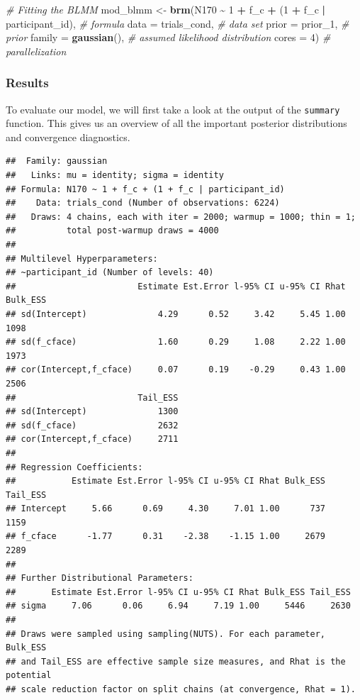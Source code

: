 \documentclass[
  doc,12pt,floatsintext]{apa7}
\newenvironment{Shaded}{\begin{snugshade}}{\end{snugshade}}
\newcommand{\AttributeTok}[1]{\textcolor[rgb]{0.13,0.29,0.53}{#1}}
\newcommand{\CommentTok}[1]{\textcolor[rgb]{0.56,0.35,0.01}{\textit{#1}}}
\newcommand{\DecValTok}[1]{\textcolor[rgb]{0.00,0.00,0.81}{#1}}
\newcommand{\FunctionTok}[1]{\textcolor[rgb]{0.13,0.29,0.53}{\textbf{#1}}}
\newcommand{\NormalTok}[1]{#1}
\newcommand{\OtherTok}[1]{\textcolor[rgb]{0.56,0.35,0.01}{#1}}
\newcommand{\SpecialCharTok}[1]{\textcolor[rgb]{0.81,0.36,0.00}{\textbf{#1}}}
\begin{document}
\begin{Shaded}
\begin{Highlighting}[]
\CommentTok{\# Fitting the BLMM}
\NormalTok{mod\_blmm }\OtherTok{\textless{}{-}} \FunctionTok{brm}\NormalTok{(N170 }\SpecialCharTok{\textasciitilde{}} \DecValTok{1} \SpecialCharTok{+}\NormalTok{ f\_c }\SpecialCharTok{+}\NormalTok{ (}\DecValTok{1} \SpecialCharTok{+}\NormalTok{ f\_c }\SpecialCharTok{|}\NormalTok{ participant\_id), }\CommentTok{\# formula}
                \AttributeTok{data =}\NormalTok{ trials\_cond, }\CommentTok{\# data set}
                \AttributeTok{prior =}\NormalTok{ prior\_1, }\CommentTok{\# prior}
                \AttributeTok{family =} \FunctionTok{gaussian}\NormalTok{(), }\CommentTok{\# assumed likelihood distribution}
                \AttributeTok{cores =} \DecValTok{4}\NormalTok{) }\CommentTok{\# parallelization}
\end{Highlighting}
\end{Shaded}

\subsubsection{Results}\label{results-1}

To evaluate our model, we will first take a look at the output of the \texttt{summary} function. This gives us an overview of all the important posterior distributions and convergence diagnostics.



\footnotesize

\begin{verbatim}
##  Family: gaussian 
##   Links: mu = identity; sigma = identity 
## Formula: N170 ~ 1 + f_c + (1 + f_c | participant_id) 
##    Data: trials_cond (Number of observations: 6224) 
##   Draws: 4 chains, each with iter = 2000; warmup = 1000; thin = 1;
##          total post-warmup draws = 4000
## 
## Multilevel Hyperparameters:
## ~participant_id (Number of levels: 40) 
##                        Estimate Est.Error l-95% CI u-95% CI Rhat Bulk_ESS
## sd(Intercept)              4.29      0.52     3.42     5.45 1.00     1098
## sd(f_cface)                1.60      0.29     1.08     2.22 1.00     1973
## cor(Intercept,f_cface)     0.07      0.19    -0.29     0.43 1.00     2506
##                        Tail_ESS
## sd(Intercept)              1300
## sd(f_cface)                2632
## cor(Intercept,f_cface)     2711
## 
## Regression Coefficients:
##           Estimate Est.Error l-95% CI u-95% CI Rhat Bulk_ESS Tail_ESS
## Intercept     5.66      0.69     4.30     7.01 1.00      737     1159
## f_cface      -1.77      0.31    -2.38    -1.15 1.00     2679     2289
## 
## Further Distributional Parameters:
##       Estimate Est.Error l-95% CI u-95% CI Rhat Bulk_ESS Tail_ESS
## sigma     7.06      0.06     6.94     7.19 1.00     5446     2630
## 
## Draws were sampled using sampling(NUTS). For each parameter, Bulk_ESS
## and Tail_ESS are effective sample size measures, and Rhat is the potential
## scale reduction factor on split chains (at convergence, Rhat = 1).
\end{verbatim}
\end{document}

